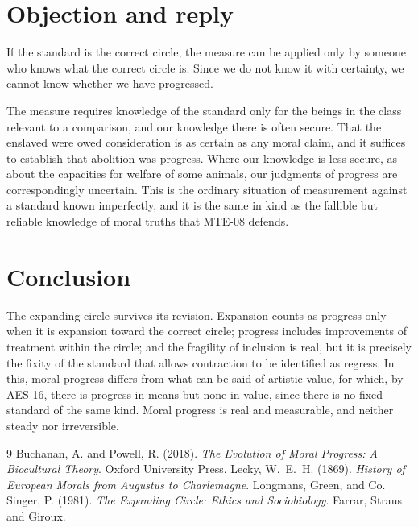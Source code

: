 \documentclass{situationist-preprint}
\begin{document}
\section{Objection and reply}

\begin{objection}
If the standard is the correct circle, the measure can be applied only by someone who knows what the correct circle is. Since we do not know it with certainty, we cannot know whether we have progressed.
\end{objection}

\begin{reply}
The measure requires knowledge of the standard only for the beings in the class relevant to a comparison, and our knowledge there is often secure. That the enslaved were owed consideration is as certain as any moral claim, and it suffices to establish that abolition was progress. Where our knowledge is less secure, as about the capacities for welfare of some animals, our judgments of progress are correspondingly uncertain. This is the ordinary situation of measurement against a standard known imperfectly, and it is the same in kind as the fallible but reliable knowledge of moral truths that MTE-08 defends.
\end{reply}

\section{Conclusion}

The expanding circle survives its revision. Expansion counts as progress only when it is expansion toward the correct circle; progress includes improvements of treatment within the circle; and the fragility of inclusion is real, but it is precisely the fixity of the standard that allows contraction to be identified as regress. In this, moral progress differs from what can be said of artistic value, for which, by AES-16, there is progress in means but none in value, since there is no fixed standard of the same kind. Moral progress is real and measurable, and neither steady nor irreversible.

\begin{thebibliography}{9}\small
{} Buchanan, A. and Powell, R. (2018). \emph{The Evolution of Moral Progress: A Biocultural Theory}. Oxford University Press.
 Lecky, W.~E.~H. (1869). \emph{History of European Morals from Augustus to Charlemagne}. Longmans, Green, and Co.
 Singer, P. (1981). \emph{The Expanding Circle: Ethics and Sociobiology}. Farrar, Straus and Giroux.
\end{thebibliography}
\end{document}
